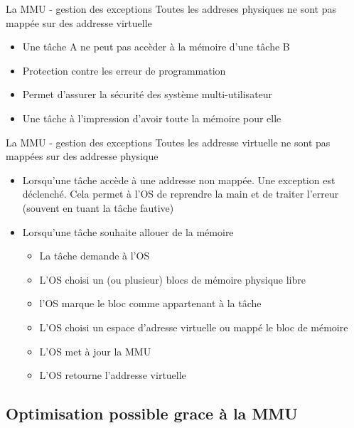 \begin{frame}{La MMU - gestion des exceptions}
  Toutes les  addreses physiques ne  sont pas mappée sur  des addresse
  virtuelle
  \begin{itemize} 
  \item Une tâche A ne peut pas accèder à la mémoire d'une tâche B
  \item Protection contre les erreur de programmation
  \item Permet d'assurer la sécurité des système multi-utilisateur
  \item Une tâche à l'impression d'avoir toute la mémoire pour elle
  \end{itemize} 
\end{frame} 

\begin{frame}{La MMU - gestion des exceptions}
  Toutes les addresse  virtuelle ne sont pas mappées  sur des addresse
  physique
  \begin{itemize}
  \item  Lorsqu'une  tâche accède  à  une  addresse  non mappée.   Une
    exception est déclenché.  Cela permet  à l'OS de reprendre la main
    et de traiter l'erreur (souvent en tuant la tâche fautive)
  \item Lorsqu'une tâche souhaite allouer de la mémoire
    \begin{itemize}
    \item  La tâche demande à l'OS
    \item L'OS choisi un (ou plusieur) blocs de mémoire physique libre
    \item l'OS marque le bloc comme appartenant à la tâche
    \item L'OS choisi  un espace d'adresse virtuelle ou  mappé le bloc
      de mémoire
    \item L'OS met à jour la MMU
    \item L'OS retourne l'addresse virtuelle
    \end{itemize} 
  \end{itemize} 
\end{frame} 

\subsection{Optimisation possible grace à la MMU}

